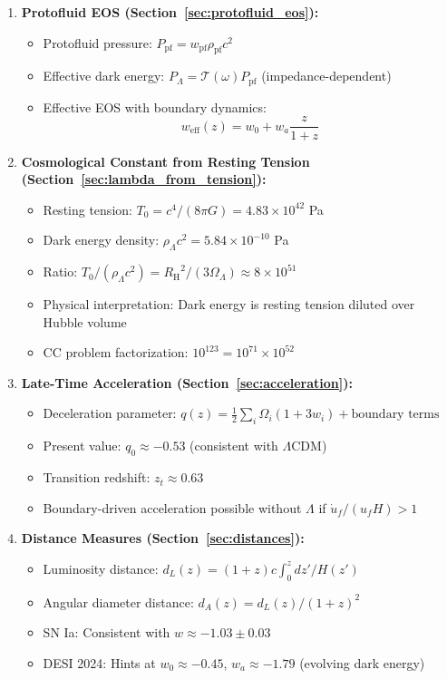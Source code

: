 \documentclass[11pt,a4paper]{article}
\newcommand{\Tzero}{\ensuremath{T_0}}
\newcommand{\RH}{\ensuremath{R_{\mathrm{H}}}}
\newcommand{\wpf}{\ensuremath{w_{\mathrm{pf}}}}
\newcommand{\weff}{\ensuremath{w_{\mathrm{eff}}}}
\newcommand{\Ppf}{\ensuremath{P_{\mathrm{pf}}}}
\newcommand{\rhopf}{\ensuremath{\rho_{\mathrm{pf}}}}
\newcommand{\OmegaLam}{\ensuremath{\Omega_\Lambda}}
\theoremstyle{definition}
\theoremstyle{remark}
\begin{document}
\begin{enumerate}[leftmargin=*, itemsep=0.5em]
\item \textbf{Protofluid EOS (Section~\ref{sec:protofluid_eos}):}
\begin{itemize}
\item Protofluid pressure: $\Ppf = \wpf \rhopf c^2$
\item Effective dark energy: $P_\Lambda = \mathcal{T}(\omega)\Ppf$ (impedance-dependent)
\item Effective EOS with boundary dynamics:
\begin{equation}
\weff(z) = w_0 + w_a \frac{z}{1+z}
\end{equation}
\end{itemize}

\item \textbf{Cosmological Constant from Resting Tension (Section~\ref{sec:lambda_from_tension}):}
\begin{itemize}
\item Resting tension: $\Tzero = c^4/(8\pi G) = 4.83 \times 10^{42}$ Pa
\item Dark energy density: $\rho_\Lambda c^2 = 5.84 \times 10^{-10}$ Pa
\item Ratio: $\Tzero/(\rho_\Lambda c^2) = \RH^2/(3\OmegaLam) \approx 8 \times 10^{51}$
\item Physical interpretation: Dark energy is resting tension diluted over Hubble volume
\item CC problem factorization: $10^{123} = 10^{71} \times 10^{52}$
\end{itemize}

\item \textbf{Late-Time Acceleration (Section~\ref{sec:acceleration}):}
\begin{itemize}
\item Deceleration parameter: $q(z) = \frac{1}{2}\sum_i \Omega_i(1+3w_i) + \text{boundary terms}$
\item Present value: $q_0 \approx -0.53$ (consistent with $\Lambda$CDM)
\item Transition redshift: $z_t \approx 0.63$
\item Boundary-driven acceleration possible without $\Lambda$ if $\dot{u}_f/(u_f H) > 1$
\end{itemize}

\item \textbf{Distance Measures (Section~\ref{sec:distances}):}
\begin{itemize}
\item Luminosity distance: $d_L(z) = (1+z)c \int_0^z dz'/H(z')$
\item Angular diameter distance: $d_A(z) = d_L(z)/(1+z)^2$
\item SN Ia: Consistent with $w \approx -1.03 \pm 0.03$
\item DESI 2024: Hints at $w_0 \approx -0.45$, $w_a \approx -1.79$ (evolving dark energy)
\end{itemize}
\end{enumerate}
\end{document}
